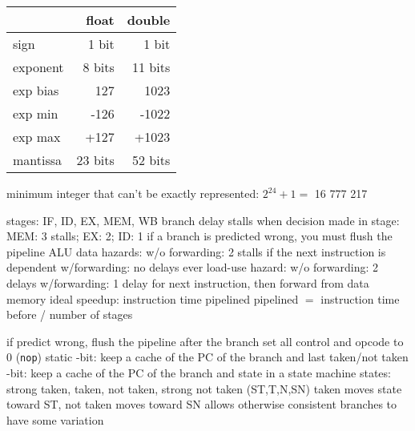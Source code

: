 \documentclass[12pt]{article}
\begin{document}
\begin{spacing}{0.8}
\begin{multicols*}{2}
\begin{flushleft}
\begin{outline}[longenum]
\begin{tabular}{|l r r|}
    $ $      & float   & double  \\ \hline
    sign     & 1 bit   & 1 bit   \\ \hline
    exponent & 8 bits  & 11 bits \\ \hline
    exp bias & 127     & 1023    \\ \hline
    exp min  & -126    & -1022   \\ \hline
    exp max  & +127    & +1023   \\ \hline
    mantissa & 23 bits & 52 bits \\ \hline
  \end{tabular}
  \1 minimum integer that can't be exactly represented: $2^{24} + 1 = $ 16 777 217 



   stages: IF, ID, EX, MEM, WB
  \1 branch delay stalls when decision made in stage:
    \2 MEM: 3 stalls; EX: 2; ID: 1
  \1 if a branch is predicted wrong, you must flush the pipeline
  \1 ALU data hazards:
    \2 w/o forwarding: 2 stalls if the next instruction is dependent
    \2 w/forwarding: no delays ever
  \1 load-use hazard:
    \2 w/o forwarding: 2 delays
    \2 w/forwarding: 1 delay for next instruction, then forward from data memory
  \1 ideal speedup: instruction time pipelined pipelined $=$ instruction time before / number of stages

  \1 if predict wrong, flush the pipeline after the branch
    \2 set all control and opcode to 0 (\verb|nop|)
  \1 static
  -bit: keep a cache of the PC of the branch and last taken/not taken
  -bit: keep a cache of the PC of the branch and state in a state machine
     states: strong taken, taken, not taken, strong not taken
      (ST,T,N,SN)
    \2 taken moves state toward ST, not taken moves toward SN
    \2 allows otherwise consistent branches to have some variation


\end{outline}
\end{flushleft}
\end{multicols*}
\end{spacing}
\end{document}
